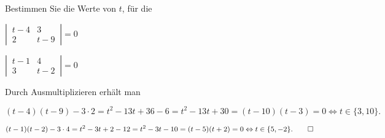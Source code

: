 Bestimmen Sie die Werte von $t$, für die
\begin{teilaufgaben}
\item
$
\left|\,\begin{matrix}
t-4&3\\2&t-9
\end{matrix}\,\right|=0
$
\item
$
\left|\,\begin{matrix}
t-1&4\\3&t-2
\end{matrix}\,\right|=0
$
\end{teilaufgaben}


\begin{loesung}
Durch Ausmultiplizieren erhält man
\begin{teilaufgaben}
\item
\[
(t-4)(t-9)-3\cdot 2=t^2 -13t +36-6=t^2-13t+30=(t-10)(t-3)=0\Leftrightarrow t\in\{3,10\}.
\]
\item
\[
(t-1)(t-2)-3\cdot 4=t^2-3t+2-12=t^2-3t-10=(t-5)(t+2)=0\Leftrightarrow t\in\{5,-2\}.
\qedhere
\]
\end{teilaufgaben}
\end{loesung}

